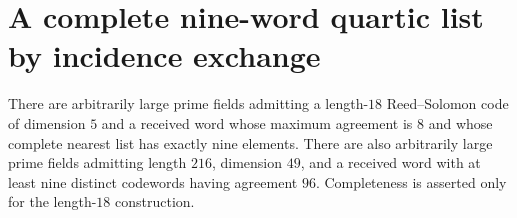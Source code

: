 \section{A complete nine-word quartic list by incidence exchange}
\label{app:nine-quartic-exchange}

\begin{theorem}
\label{thm:nine-quartic-exchange}
There are arbitrarily large prime fields admitting a length-$18$ Reed--Solomon code of dimension $5$ and a received word whose maximum agreement is $8$ and whose complete nearest list has exactly nine elements. There are also arbitrarily large prime fields admitting length $216$, dimension $49$, and a received word with at least nine distinct codewords having agreement $96$. Completeness is asserted only for the length-$18$ construction.
\end{theorem}

